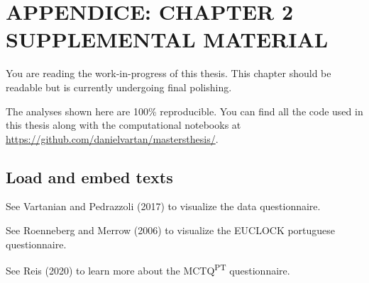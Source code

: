 \documentclass[
  12pt,
  a4paper,
  oneside]{tesesusp}
\begin{document}
\cleardoublepage
{}
{}
\appendix

\hypertarget{appendice-chapter-2-supplemental-material}{%
\chapter{APPENDICE: CHAPTER 2 SUPPLEMENTAL
MATERIAL}\label{appendice-chapter-2-supplemental-material}}

\begin{tcolorbox}[enhanced jigsaw, rightrule=.15mm, colback=white, colbacktitle=quarto-callout-note-color!10!white, toptitle=1mm, bottomtitle=1mm, toprule=.15mm, bottomrule=.15mm, colframe=quarto-callout-note-color-frame, opacitybacktitle=0.6, opacityback=0, coltitle=black, left=2mm, breakable, titlerule=0mm, title=\textcolor{quarto-callout-note-color}{\faInfo}\hspace{0.5em}{Note}, arc=.35mm, leftrule=.75mm]

You are reading the work-in-progress of this thesis. This chapter should
be readable but is currently undergoing final polishing.

\end{tcolorbox}

The analyses shown here are 100\% reproducible. You can find all the
code used in this thesis along with the computational notebooks at
\url{https://github.com/danielvartan/mastersthesis/}.

\hypertarget{load-and-embed-texts}{%
\section{Load and embed texts}\label{load-and-embed-texts}}

See Vartanian and Pedrazzoli (2017) to visualize the data questionnaire.

See Roenneberg and Merrow (2006) to visualize the EUCLOCK portuguese
questionnaire.

See Reis (2020) to learn more about the MCTQ\textsuperscript{PT}
questionnaire.
\end{document}
